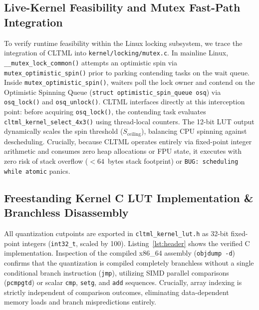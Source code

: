 \documentclass[conference]{IEEEtran}
\begin{document}
\subsection{Live-Kernel Feasibility and Mutex Fast-Path Integration}
To verify runtime feasibility within the Linux locking subsystem, we trace the integration of CLTML into \texttt{kernel/locking/mutex.c}. In mainline Linux, \texttt{\_\_mutex\_lock\_common()} attempts an optimistic spin via \texttt{mutex\_optimistic\_spin()} prior to parking contending tasks on the wait queue. Inside \texttt{mutex\_optimistic\_spin()}, waiters poll the lock owner and contend on the Optimistic Spinning Queue (\texttt{struct optimistic\_spin\_queue osq}) via \texttt{osq\_lock()} and \texttt{osq\_unlock()}. CLTML interfaces directly at this interception point: before acquiring \texttt{osq\_lock()}, the contending task evaluates \texttt{cltml\_kernel\_select\_4x3()} using thread-local counters. The 12-bit LUT output dynamically scales the spin threshold ($S_{\text{ceiling}}$), balancing CPU spinning against descheduling. Crucially, because CLTML operates entirely via fixed-point integer arithmetic and consumes zero heap allocations or FPU state, it executes with zero risk of stack overflow ($<64$~bytes stack footprint) or \texttt{BUG: scheduling while atomic} panics.

\subsection{Freestanding Kernel C LUT Implementation \& Branchless Disassembly}
All quantization cutpoints are exported in \texttt{cltml\_kernel\_lut.h} as 32-bit fixed-point integers (\texttt{int32\_t}, scaled by 100). Listing~\ref{lst:header} shows the verified C implementation. Inspection of the compiled x86\_64 assembly (\texttt{objdump -d}) confirms that the quantization is compiled completely branchless without a single conditional branch instruction (\texttt{jmp}), utilizing SIMD parallel comparisons (\texttt{pcmpgtd}) or scalar \texttt{cmp}, \texttt{setg}, and \texttt{add} sequences. Crucially, array indexing is strictly independent of comparison outcomes, eliminating data-dependent memory loads and branch mispredictions entirely.
\end{document}
